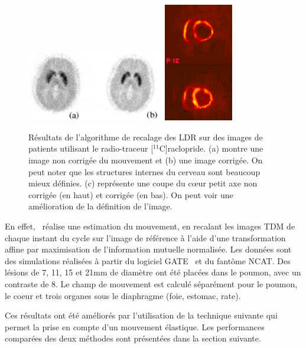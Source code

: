 \begin{figure}[h!]
	\begin{center}
		\includegraphics[width=6cm]{images/bloomfield2003design} \includegraphics[width=3cm]{images/livieratos2005rigid}
	\end{center}
	\caption[Résultats de l'algorithme de recalage des LDR sur des images de patients]{Résultats de l'algorithme de recalage des LDR sur des images de patients utilisant le radio-traceur [$^{11}$C]raclopride. (a) montre une image non corrigée du mouvement et (b) une image corrigée. On peut noter que les structures internes du cerveau sont beaucoup mieux définies. (c) représente une coupe du c\oe{}ur petit axe non corrigée (en haut) et corrigée (en bas). On peut voir une amélioration de la définition de l'image.} 
	\label{fig:ameliorationLOR}
\end{figure}
 

En effet,~\cite{lamare2007respiratory} réalise une estimation du mouvement, en recalant les images TDM de chaque instant du cycle sur l'image de référence à l'aide d'une transformation affine par maximisation de l'information mutuelle normalisée. Les données sont des simulations réalisées à partir du logiciel GATE~\cite{jan2004gate} et du fantôme NCAT. Des lésions de 7, 11, 15 et 21mm de diamètre ont été placées dans le poumon, avec un contraste de 8. Le champ de mouvement est calculé séparément pour le poumon, le coeur et trois organes sous le diaphragme (foie, estomac, rate).

Ces résultats ont été améliorés par l'utilisation de la technique suivante qui permet la prise en compte d'un mouvement élastique. Les performances comparées des deux méthodes sont présentées dans la section suivante.

